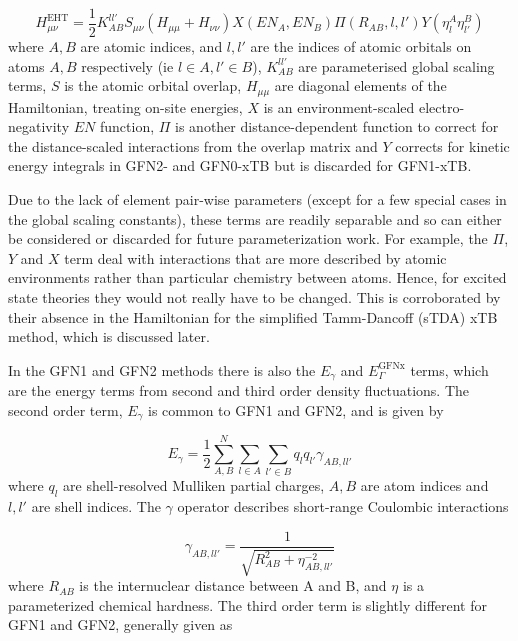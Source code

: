 \begin{equation}
H_{\mu\nu}^{\text{EHT}} = \frac{1}{2} K_{AB}^{ll'}S_{\mu\nu}\left(H_{\mu\mu} + H_{\nu\nu}\right)X\left(EN_A, EN_B\right)\Pi\left(R_{AB}, l, l'\right)Y\left(\eta^A_l\eta^B_{l'}\right)
\end{equation}
%
where $A,B$ are atomic indices, and $l,l'$ are the indices of atomic orbitals on 
atoms $A, B$ respectively (ie $l \in A, l' \in B$), $K_{AB}^{ll'}$ are parameterised global 
scaling terms, $S$ is the atomic orbital overlap, $H_{\mu\mu}$ are diagonal elements
of the Hamiltonian, treating on-site energies, $X$ is an environment-scaled electro-negativity
$EN$ function, $\Pi$ is another distance-dependent function to correct for the distance-scaled
interactions from the overlap matrix and $Y$ corrects for kinetic energy integrals
in GFN2- and GFN0-xTB but is discarded for GFN1-xTB.

Due to the lack of element pair-wise parameters (except for a few special cases 
in the global scaling constants), these terms are readily separable and so can either 
be considered or discarded for future parameterization work. For example, the $\Pi$,
$Y$ and $X$ term deal with interactions that are more described by atomic environments 
rather than particular chemistry between atoms. Hence, for excited state theories they 
would not really have to be changed. This is corroborated by their absence in the 
Hamiltonian for the simplified Tamm-Dancoff (sTDA) xTB\cite{Grimme2016} method, 
which is discussed later.

In the GFN1 and GFN2 methods there is also the $E_\gamma$ and $E_\Gamma^{\text{GFNx}}$ 
terms, which are the energy terms from second and third order density fluctuations. 
The second order term, $E_\gamma$ is common to GFN1 and GFN2, and is given by

\begin{equation}
E_\gamma = \frac{1}{2} \sum^{N}_{A,B} \sum_{l \in A} \sum_{l' \in B} q_l q_{l'} \gamma_{AB, ll'}
\end{equation}
%
where $q_l$ are shell-resolved Mulliken partial charges, $A,B$ are atom indices 
and $l,l'$ are shell indices. The $\gamma$ operator describes short-range Coulombic 
interactions

\begin{equation}
\gamma_{AB, ll'} = \frac{1}{\sqrt{R^2_{AB} + \eta^{-2}_{AB, ll'}}}
\end{equation}
%
where $R_{AB}$ is the internuclear distance between A and B, and $\eta$ is a parameterized 
chemical hardness. The third order term is slightly different for GFN1 and GFN2,
generally given as

